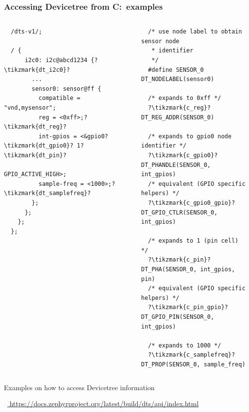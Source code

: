 \documentclass[handout]{beamer}
\begin{document}
\begin{frame}[fragile]
  \frametitle{Accessing Devicetree from C:\ examples}

  \begin{listing}[H]
    \begin{columns}
      \begin{column}{0.5\textwidth}
        \begin{verbatim}
  /dts-v1/;

  / {
      i2c0: i2c@abcd1234 {?\tikzmark{dt_i2c0}?
        ...
        sensor0: sensor@ff {
          compatible = "vnd,mysensor";
          reg = <0xff>;?\tikzmark{dt_reg}?
          int-gpios = <&gpio0?\tikzmark{dt_gpio0}? 1?\tikzmark{dt_pin}?
                        GPIO_ACTIVE_HIGH>;
          sample-freq = <1000>;?\tikzmark{dt_samplefreq}?
        };
      };
    };
  };
      \end{verbatim}
      \end{column}
      \begin{column}{0.5\textwidth}
        \begin{verbatim}
  /* use node label to obtain sensor node
   * identifier
   */
  #define SENSOR_0 DT_NODELABEL(sensor0)

  /* expands to 0xff */
  ?\tikzmark{c_reg}?DT_REG_ADDR(SENSOR_0)

  /* expands to gpio0 node identifier */
  ?\tikzmark{c_gpio0}?DT_PHANDLE(SENSOR_0, int_gpios)
  /* equivalent (GPIO specific helpers) */
  ?\tikzmark{c_gpio0_gpio}?DT_GPIO_CTLR(SENSOR_0, int_gpios)

  /* expands to 1 (pin cell) */
  ?\tikzmark{c_pin}?DT_PHA(SENSOR_0, int_gpios, pin)
  /* equivalent (GPIO specific helpers) */
  ?\tikzmark{c_pin_gpio}?DT_GPIO_PIN(SENSOR_0, int_gpios)

  /* expands to 1000 */
  ?\tikzmark{c_samplefreq}?DT_PROP(SENSOR_0, sample_freq)
      \end{verbatim}
      \end{column}
    \end{columns}
    \caption{Examples on how to access Devicetree information}
  \end{listing}

  \centering\faBook~\href{
    https://docs.zephyrproject.org/latest/build/dts/api/index.html}{
    https://docs.zephyrproject.org/latest/build/dts/api/index.html
  }

\end{frame}
\end{document}
